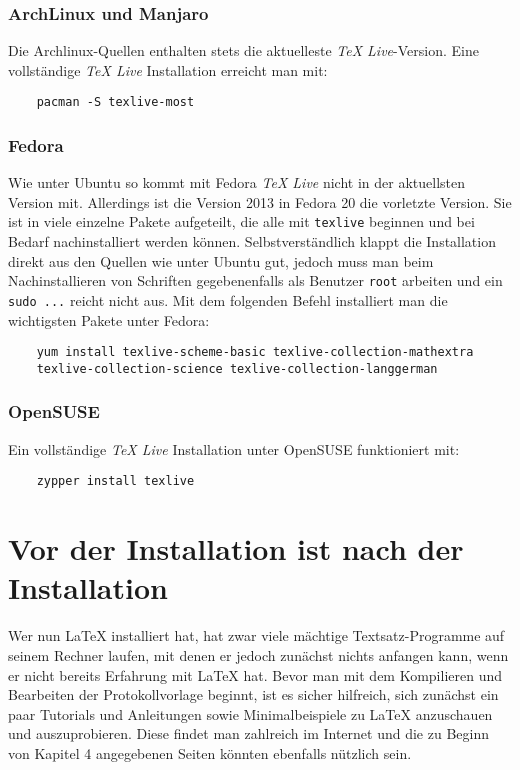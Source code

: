\subsubsection{ArchLinux und Manjaro}
Die Archlinux-Quellen enthalten stets die aktuelleste \textit{TeX Live}-Version. Eine vollständige \textit{TeX Live} Installation erreicht man mit:
\begin{verbatim}
	pacman -S texlive-most
\end{verbatim}

\subsubsection{Fedora}
Wie unter Ubuntu so kommt mit Fedora \textit{TeX Live} nicht in der aktuellsten Version mit.
Allerdings ist die Version 2013 in Fedora 20 die vorletzte Version.
Sie ist in viele einzelne Pakete aufgeteilt, die alle mit \verb|texlive| beginnen und bei Bedarf nachinstalliert werden können.
Selbstverständlich klappt die Installation direkt aus den Quellen wie unter Ubuntu gut, jedoch muss man beim Nachinstallieren von Schriften gegebenenfalls als Benutzer \verb|root| arbeiten und ein \verb|sudo ...| reicht nicht aus.
Mit dem folgenden Befehl installiert man die wichtigsten Pakete unter Fedora:
\begin{verbatim}
	yum install texlive-scheme-basic texlive-collection-mathextra
	texlive-collection-science texlive-collection-langgerman 
\end{verbatim}

\subsubsection{OpenSUSE}
Ein vollständige \textit{TeX Live} Installation unter OpenSUSE funktioniert mit:
\begin{verbatim}
	zypper install texlive
\end{verbatim}

\section{Vor der Installation ist nach der Installation}
Wer nun LaTeX installiert hat, hat zwar viele mächtige Textsatz-Programme auf seinem Rechner laufen, mit denen er jedoch zunächst nichts anfangen kann, wenn er nicht bereits Erfahrung mit LaTeX hat. Bevor man mit dem Kompilieren und Bearbeiten der Protokollvorlage beginnt, ist es sicher hilfreich, sich zunächst ein paar Tutorials und Anleitungen sowie Minimalbeispiele zu LaTeX anzuschauen und auszuprobieren. Diese findet man zahlreich im Internet und die zu Beginn von Kapitel 4 angegebenen Seiten könnten ebenfalls nützlich sein.

